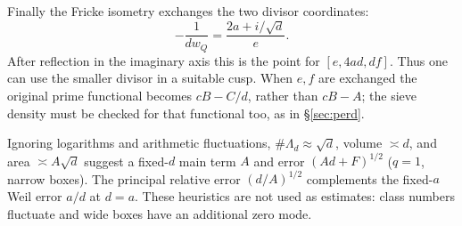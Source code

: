 Finally the Fricke isometry exchanges the two divisor coordinates:
\[
 -\frac1{dw_Q}=\frac{2a+i/\sqrt d}{e}.
\]
After reflection in the imaginary axis this is the point for
$[e,4ad,df]$. Thus one can use the smaller divisor in a suitable cusp.
When $e,f$ are exchanged the original prime functional becomes
$cB-C/d$, rather than $cB-A$; the sieve density must be checked for that
functional too, as in \S\ref{sec:perd}.

\begin{assessment}
Ignoring logarithms and arithmetic fluctuations, $\#\Lambda_d\approx\sqrt d$,
volume $\asymp d$, and area $\asymp A\sqrt d$ suggest a fixed-$d$ main term
$A$ and error $(Ad+F)^{1/2}$ ($q=1$, narrow boxes). The principal relative
error $(d/A)^{1/2}$ complements the fixed-$a$ Weil error $a/d$ at $d=a$.
These heuristics are not used as estimates: class numbers fluctuate and
wide boxes have an additional zero mode.
\end{assessment}
